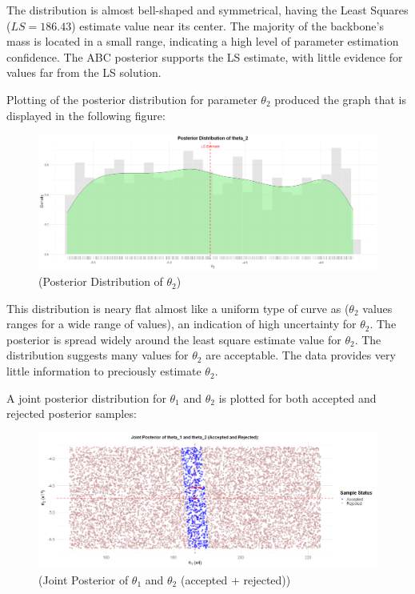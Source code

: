\documentclass[12pt,a4paper]{article}
\begin{document}
The distribution is almost bell-shaped and symmetrical, 
having the Least Squares ($LS= 186.43$) estimate value near its center.
The majority of the backbone's mass is located in a small range, 
indicating a high level of parameter estimation confidence. The ABC posterior supports the 
LS estimate, with little evidence for values 
far from the LS solution. 

Plotting of the posterior distribution 
for parameter $\theta_2$ produced the graph that is displayed in the following figure:


\begin{figure}[H]
  \centering
  \includegraphics[width=\textwidth]{m8.png}
  \caption{(Posterior Distribution of $\theta_2$)}
  \label{fig:Posterior Distribution of theta_2}
\end{figure}

This distribution is neary flat almost like a uniform type of curve as ($\theta_2$ values ranges for a wide range of values), 
an indication of high uncertainty for $\theta_2$. The posterior is spread 
widely around the least square estimate value for $\theta_2$. 
The distribution suggests many values for $\theta_2$ 
are acceptable. The data provides very little information to 
preciously estimate $\theta_2$. 

A joint posterior distribution for $\theta_1$ and 
$\theta_2$ is plotted for both accepted and rejected 
posterior samples:

\begin{figure}[H]
  \centering
  \includegraphics[width=\textwidth]{y27.png}
  \caption{(Joint Posterior of $\theta_1$ and $\theta_2$ (accepted + rejected))}
  \label{fig:Joint Posterior of $\theta_1$ and $\theta_2$}
\end{figure}
\end{document}
